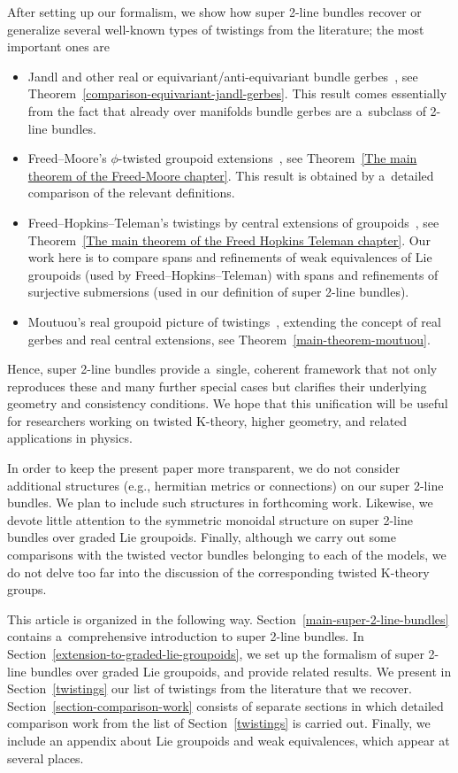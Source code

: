 \documentclass[pdftex]{sigma}
\numberwithin{equation}{section}
\begin{document}
After setting up our formalism, we show how super 2-line bundles recover or generalize several well-known types of twistings from the literature; the most important ones are
\begin{itemize}\itemsep=0pt
\item
Jandl and other real or equivariant/anti-equivariant bundle gerbes~\cite{gawedzki8,nikolaus2,schreiber1}, see Theorem~\ref{comparison-equivariant-jandl-gerbes}. This result comes essentially from the fact that already over manifolds bundle gerbes are a~subclass of 2-line bundles.
\item
Freed--Moore's $\phi$-twisted groupoid extensions~\cite{Freeda}, see Theorem~\ref{The main theorem of the Freed-Moore chapter}. This result is obtained by a~detailed comparison of the relevant definitions.

\item
 Freed--Hopkins--Teleman's twistings by central extensions of groupoids~\cite{Freed2011a}, see Theorem~\ref{The main theorem of the Freed Hopkins Teleman chapter}. Our work here is to compare spans and refinements of weak equivalences of Lie groupoids (used by Freed--Hopkins--Teleman) with spans and refinements of surjective submersions (used in our definition of super 2-line bundles).

\item
Moutuou's real groupoid picture of twistings~\cite{mohamedmoutuou2012}, extending the concept of real gerbes and real central extensions, see Theorem~\ref{main-theorem-moutuou}.
\end{itemize}
Hence, super 2-line bundles provide a~single, coherent framework that not only reproduces these and many further special cases but clarifies their underlying geometry and consistency conditions.
We hope that this unification will be useful for researchers working on twisted K-theory, higher geometry, and related applications in physics.

In order to keep the present paper more transparent, we do not consider additional structures (e.g., hermitian metrics or connections) on our super 2-line bundles. We plan to include such structures in forthcoming work. Likewise, we devote little attention to the symmetric monoidal structure on super 2-line bundles over graded Lie groupoids. Finally, although we
carry out some comparisons with the twisted vector bundles belonging to each of the models, we do not delve too far into the discussion of the corresponding twisted K-theory groups.

This article is organized in the following way. Section~\ref{main-super-2-line-bundles} contains a~comprehensive introduction to super 2-line bundles. In Section~\ref{extension-to-graded-lie-groupoids}, we set up the formalism of super 2-line bundles over graded Lie groupoids, and provide related results. We present in Section~\ref{twistings} our list of twistings from the literature that we recover. Section~\ref{section-comparison-work} consists of separate sections in which detailed comparison work from the list of Section~\ref{twistings} is carried out. Finally, we include an appendix about Lie groupoids and weak equivalences, which appear at several places.
\end{document}
